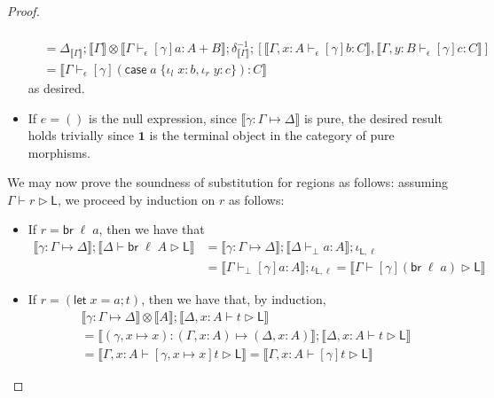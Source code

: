 \documentclass[acmsmall,screen,review]{acmart}
\newcommand{\mb}[1]{\ensuremath{\mathbf{#1}}}
\newcommand{\ms}[1]{\ensuremath{\mathsf{#1}}}
\newcommand{\lto}{:}
\newcommand{\linl}[1]{\iota_l\;{#1}}
\newcommand{\linr}[1]{\iota_r\;{#1}}
\newcommand{\caseexpr}[5]{\ms{case}\;#1\;\{\linl{#2} \lto #3, \linr{#4} \lto #5\}}
\newcommand{\letstmt}[3]{\ensuremath{\ms{let}\;#1 = #2; #3}}
\newcommand{\brb}[2]{\ms{br}\;#1\;#2}
\newcommand{\bhyp}[2]{#1 : #2}
\newcommand{\hasty}[4]{#1 \vdash_{#2} #3: {#4}}
\newcommand{\haslb}[3]{#1 \vdash #2 \rhd #3}
\newcommand{\issubst}[3]{#1: #2 \mapsto #3}
\newcommand{\dnt}[1]{\llbracket{#1}\rrbracket}
\begin{document}
\begin{proof}
\begin{itemize}[leftmargin=*]
\begin{equation}
\begin{aligned}
        \\ &
        = \Delta_{\dnt{\Gamma}}
        ; \dnt{\Gamma} \otimes \dnt{\hasty{\Gamma}{\epsilon}{[\gamma]a}{A + B}}
        ; \delta^{-1}_{\dnt{\Gamma}} 
        ; [
          \dnt{\hasty{\Gamma, \bhyp{x}{A}}{\epsilon}{[\gamma]b}{C}}, 
          \dnt{\hasty{\Gamma, \bhyp{y}{B}}{\epsilon}{[\gamma]c}{C}}
        ]
        \\ &
        = \dnt{\hasty{\Gamma}{\epsilon}{[\gamma](\caseexpr{a}{x}{b}{y}{c})}{C}}
      \end{aligned}
    \end{equation} 
    as desired.
    \item If $e = ()$ is the null expression, since $\dnt{\issubst{\gamma}{\Gamma}{\Delta}}$ is
    pure, the desired result holds trivially since $\mb{1}$ is the terminal object in the category
    of pure morphisms.
  \end{itemize}
  We may now prove the soundness of substitution for regions as follows: assuming
  $\haslb{\Gamma}{r}{\ms{L}}$, we proceed by induction on $r$ as follows:
  \begin{itemize}[leftmargin=*]
    \item If $r = \brb{\ell}{a}$, then we have that
    \begin{equation}
      \begin{aligned}
      \dnt{\issubst{\gamma}{\Gamma}{\Delta}} ; \dnt{\haslb{\Delta}{\brb{\ell}{A}}{\ms{L}}}
      &= \dnt{\issubst{\gamma}{\Gamma}{\Delta}}  
      ; \dnt{\hasty{\Delta}{\bot}{a}{A}} 
      ; \iota_{\ms{L}, \ell} \\
      &= \dnt{\hasty{\Gamma}{\bot}{[\gamma]a}{A}}
      ; \iota_{\ms{L}, \ell}
      = \dnt{\haslb{\Gamma}{[\gamma](\brb{\ell}{a})}{\ms{L}}} 
      \end{aligned}
    \end{equation}
    \item If $r = (\letstmt{x}{a}{t})$, then we have that, by induction,
    \begin{equation}
      \begin{aligned}
      & \dnt{\issubst{\gamma}{\Gamma}{\Delta}} \otimes \dnt{A} 
      ; \dnt{\haslb{\Delta, \bhyp{x}{A}}{t}{\ms{L}}}
      \\ &= \dnt{\issubst{(\gamma, x \mapsto x)}{(\Gamma, \bhyp{x}{A})}{(\Delta, \bhyp{x}{A})}}
      ; \dnt{\haslb{\Delta, \bhyp{x}{A}}{t}{\ms{L}}}
      \\ &= \dnt{\haslb{\Gamma, \bhyp{x}{A}}{[\gamma, x \mapsto x]t}{\ms{L}}}
          = \dnt{\haslb{\Gamma, \bhyp{x}{A}}{[\gamma]t}{\ms{L}}}

\end{aligned}
\end{equation}
\end{itemize}
\end{proof}
\end{document}
